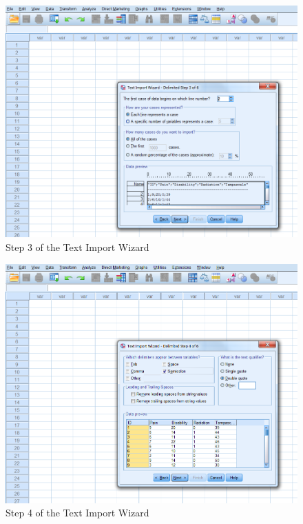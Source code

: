 \documentclass[]{book}
\theoremstyle{definition}
\theoremstyle{definition}
\theoremstyle{definition}
\theoremstyle{remark}
\begin{document}
\begin{figure}

{\centering \includegraphics[width=0.9\linewidth]{images/fig1.21} 

}

\caption{Step 3 of the Text Import Wizard}\label{fig:fig21}
\end{figure}

\begin{figure}

{\centering \includegraphics[width=0.9\linewidth]{images/fig1.22} 

}

\caption{Step 4 of the Text Import Wizard}\label{fig:fig22}
\end{figure}
\end{document}
